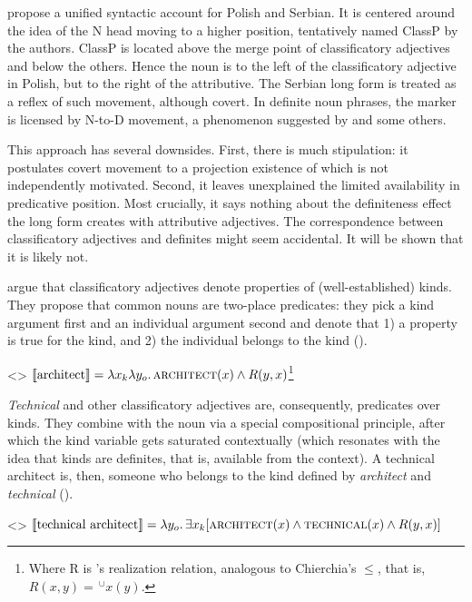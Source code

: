 \documentclass[a4paper, 12pt]{article}
\begin{document}
\textcite{rutkowski2005classificationprojectionpolish} propose a unified syntactic account for Polish and Serbian. It is centered around the idea of the N head moving to a higher position, tentatively named ClassP by the authors. ClassP is located above the merge point of classificatory adjectives and below the others. Hence the noun is to the left of the classificatory adjective in Polish, but to the right of the attributive. The Serbian long form is treated as a reflex of such movement, although covert. In definite noun phrases, the marker is licensed by N-to-D movement, a phenomenon suggested by \textcite{longobardi1994referencepropernames} and some others.

This approach has several downsides. First, there is much stipulation: it postulates covert movement to a projection existence of which is not independently motivated. Second, it leaves unexplained the limited availability in predicative position. Most crucially, it says nothing about the definiteness effect the long form creates with attributive adjectives. The correspondence between classificatory adjectives and definites might seem accidental. It will be shown that it is likely not.

\textcite{mcnally2004relationaladjectivesproperties} argue that classificatory adjectives denote properties of (well-established) kinds. They propose that common nouns are two-place predicates: they pick a kind argument first and an individual argument second and denote that 1) a property is true for the kind, and 2) the individual belongs to the kind (\nextx).

\ex<>
    $\llbracket \text{architect} \rrbracket = \lambda x_k\lambda y_o.\,\textsc{architect}(x) \land R(y,x)$\footnote{Where R is \textcite{carlson1977referencekindsenglish}'s realization relation, analogous to Chierchia's $\le$, that is, $R(x,y) = \,^\cup x(y)$.}
\xe

\textit{Technical} and other classificatory adjectives are, consequently, predicates over kinds. They combine with the noun via a special compositional principle, after which the kind variable gets saturated contextually (which resonates with the idea that kinds are definites, that is, available from the context). A technical architect is, then, someone who belongs to the kind defined by \textit{architect} and \textit{technical} (\nextx).

\ex<>
    $\llbracket \text{technical architect} \rrbracket = \lambda y_o.\,\exists x_k[\textsc{architect}(x)\land\textsc{technical}(x)\land R(y,x)]$
\xe
\end{document}
